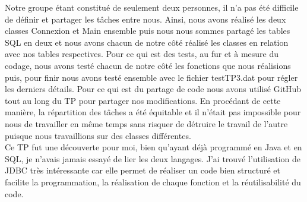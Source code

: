 \documentclass[11pt]{article}
\begin{document}
Notre groupe étant constitué de seulement deux personnes, il n'a pas été difficile de définir et partager les tâches entre nous. Ainsi, nous avons réalisé les deux classes Connexion et Main ensemble puis nous nous sommes partagé les tables SQL en deux et nous avons chacun de notre côté réalisé les classes en relation avec nos tables respectives. Pour ce qui est des tests, au fur et à mesure du codage, nous avons testé chacun de notre côté les fonctions que nous réalisions puis, pour finir nous avons testé ensemble avec le fichier testTP3.dat pour régler les derniers détails. Pour ce qui est du partage de code nous avons utilisé GitHub tout au long du TP pour partager nos modifications. En procédant de cette manière, la répartition des tâches a été équitable et il n'était pas impossible pour nous de travailler en même temps sans risquer de détruire le travail de l'autre puisque nous travaillions sur des classes différentes.~\\

Ce TP fut une découverte pour moi, bien qu'ayant déjà programmé en Java et en SQL, je n'avais jamais essayé de lier les deux langages. J'ai trouvé l'utilisation de JDBC très intéressante car elle permet de réaliser un code bien structuré et facilite la programmation, la réalisation de chaque fonction et la réutilisabilité du code.
\end{document}
